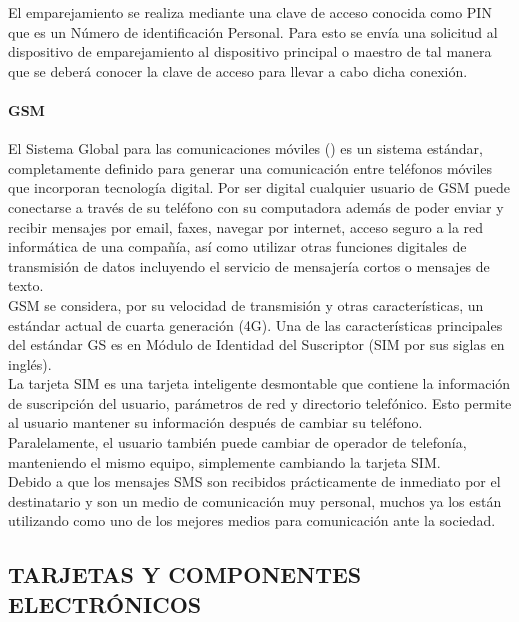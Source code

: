 El emparejamiento se realiza mediante una clave de acceso conocida como PIN que es un Número de identificación Personal. Para esto se envía una solicitud al dispositivo de emparejamiento al dispositivo principal o maestro de tal manera que se deberá conocer la clave de acceso para llevar a cabo dicha conexión. \\
 





\paragraph{GSM}

 El Sistema Global para las comunicaciones móviles  (\cite{UPS-03}) es un sistema estándar, completamente definido para generar una comunicación entre teléfonos móviles que incorporan tecnología digital. Por ser digital cualquier usuario de GSM puede conectarse a través de su teléfono con su computadora además de poder enviar y recibir mensajes por email, faxes, navegar por internet, acceso seguro a la red informática de una compañía, así como utilizar otras funciones digitales de transmisión de datos incluyendo el servicio de mensajería cortos o mensajes de texto.\\

GSM se considera, por su velocidad de transmisión y otras características, un estándar actual de cuarta generación (4G). Una de las características principales del estándar GS es en Módulo de Identidad del Suscriptor (SIM por sus siglas en inglés). \\

La tarjeta SIM es una tarjeta inteligente desmontable que contiene la información de suscripción del usuario, parámetros de red y directorio telefónico. Esto permite al usuario mantener su información después de cambiar su teléfono. Paralelamente, el usuario también puede cambiar de operador de telefonía, manteniendo el mismo equipo, simplemente cambiando la tarjeta SIM.\\

Debido a que los mensajes SMS son recibidos prácticamente de inmediato por el destinatario y son un medio de comunicación muy personal, muchos ya los están utilizando como uno de los mejores medios para comunicación ante la sociedad.\\

\subsection{TARJETAS Y COMPONENTES ELECTRÓNICOS}

